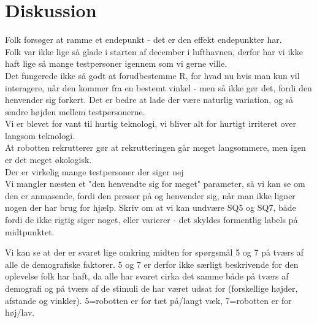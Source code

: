 \chapter{Diskussion}
\label{TestAfSkalaDiskussion}
Folk forsøger at ramme et endepunkt - det er den effekt endepunkter har.\\
Folk var ikke lige så glade i starten af december i lufthavnen, derfor har vi ikke haft lige så mange testpersoner igennem som vi gerne ville.\\
Det fungerede ikke så godt at forudbestemme R, for hvad nu hvis man kun vil interagere, når den kommer fra en bestemt vinkel - men så ikke gør det, fordi den henvender sig forkert. Det er bedre at lade der være naturlig variation, og så ændre højden mellem testpersonerne.\\
Vi er blevet for vant til hurtig teknologi, vi bliver alt for hurtigt irriteret over langsom teknologi.\\
At robotten rekrutterer gør at rekrutteringen går meget langsommere, men igen er det meget økologisk.\\
Der er virkelig mange testpersoner der siger nej\\
Vi mangler næsten et "den henvendte sig for meget" parameter, så vi kan se om den er anmasende, fordi den presser på og henvender sig, når man ikke ligner nogen der har brug for hjælp.\blankline
%
Skriv om at vi kan undvære SQ5 og SQ7, både fordi de ikke rigtig siger noget, eller varierer - det skyldes formentlig labels på midtpunktet. 

Vi kan se at der er svaret lige omkring midten for spørgsmål 5 og 7 på tværs af alle de demografiske faktorer. 5 og 7 er derfor ikke særligt beskrivende for den oplevelse folk har haft, da alle har svaret cirka det samme både på tværs af demografi og på tværs af de stimuli de har været udsat for (forskellige højder, afstande og vinkler). 5=robotten er for tæt på/langt væk, 7=robotten er for høj/lav.
